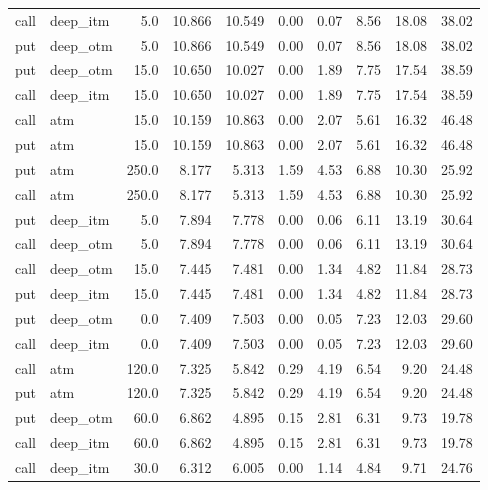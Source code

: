 \begin{longtable}{llrrrrrrrr}
\bottomrule
\endlastfoot
 call &  deep\_itm &       5.0 & 10.866 & 10.549 &    0.00 &    0.07 &   8.56 &   18.08 &   38.02 \\
  put &  deep\_otm &       5.0 & 10.866 & 10.549 &    0.00 &    0.07 &   8.56 &   18.08 &   38.02 \\
  put &  deep\_otm &      15.0 & 10.650 & 10.027 &    0.00 &    1.89 &   7.75 &   17.54 &   38.59 \\
 call &  deep\_itm &      15.0 & 10.650 & 10.027 &    0.00 &    1.89 &   7.75 &   17.54 &   38.59 \\
 call &       atm &      15.0 & 10.159 & 10.863 &    0.00 &    2.07 &   5.61 &   16.32 &   46.48 \\
  put &       atm &      15.0 & 10.159 & 10.863 &    0.00 &    2.07 &   5.61 &   16.32 &   46.48 \\
  put &       atm &     250.0 &  8.177 &  5.313 &    1.59 &    4.53 &   6.88 &   10.30 &   25.92 \\
 call &       atm &     250.0 &  8.177 &  5.313 &    1.59 &    4.53 &   6.88 &   10.30 &   25.92 \\
  put &  deep\_itm &       5.0 &  7.894 &  7.778 &    0.00 &    0.06 &   6.11 &   13.19 &   30.64 \\
 call &  deep\_otm &       5.0 &  7.894 &  7.778 &    0.00 &    0.06 &   6.11 &   13.19 &   30.64 \\
 call &  deep\_otm &      15.0 &  7.445 &  7.481 &    0.00 &    1.34 &   4.82 &   11.84 &   28.73 \\
  put &  deep\_itm &      15.0 &  7.445 &  7.481 &    0.00 &    1.34 &   4.82 &   11.84 &   28.73 \\
  put &  deep\_otm &       0.0 &  7.409 &  7.503 &    0.00 &    0.05 &   7.23 &   12.03 &   29.60 \\
 call &  deep\_itm &       0.0 &  7.409 &  7.503 &    0.00 &    0.05 &   7.23 &   12.03 &   29.60 \\
 call &       atm &     120.0 &  7.325 &  5.842 &    0.29 &    4.19 &   6.54 &    9.20 &   24.48 \\
  put &       atm &     120.0 &  7.325 &  5.842 &    0.29 &    4.19 &   6.54 &    9.20 &   24.48 \\
  put &  deep\_otm &      60.0 &  6.862 &  4.895 &    0.15 &    2.81 &   6.31 &    9.73 &   19.78 \\
 call &  deep\_itm &      60.0 &  6.862 &  4.895 &    0.15 &    2.81 &   6.31 &    9.73 &   19.78 \\
 call &  deep\_itm &      30.0 &  6.312 &  6.005 &    0.00 &    1.14 &   4.84 &    9.71 &   24.76 \\

\end{longtable}
